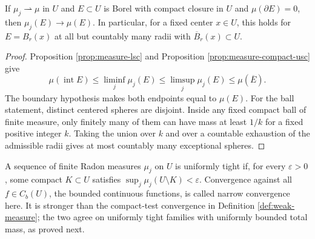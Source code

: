 \begin{corollary}\label{cor:measure-continuity-sets}
If $\mu_j\rightharpoonup\mu$ in $U$ and $E\subset U$ is Borel with compact closure in $U$ and $\mu(\partial E)=0$, then $\mu_j(E)\to\mu(E)$. In particular, for a fixed center $x\in U$, this holds for $E=B_r(x)$ at all but countably many radii with $\overline B_r(x)\subset U$.
\end{corollary}
\begin{proof}
Proposition \ref{prop:measure-lsc} and Proposition \ref{prop:measure-compact-usc} give
\[
 \mu(\operatorname{int}E)\leq\liminf_j\mu_j(E)
 \leq\limsup_j\mu_j(E)\leq\mu(\overline E).
\]
The boundary hypothesis makes both endpoints equal to $\mu(E)$. For the ball statement, distinct centered spheres are disjoint. Inside any fixed compact ball of finite measure, only finitely many of them can have mass at least $1/k$ for a fixed positive integer $k$. Taking the union over $k$ and over a countable exhaustion of the admissible radii gives at most countably many exceptional spheres.
\end{proof}

\begin{definition}\label{def:uniform-tightness}
A sequence of finite Radon measures $\mu_j$ on $U$ is uniformly tight if, for every $\varepsilon>0$, some compact $K\subset U$ satisfies $\sup_j\mu_j(U\setminus K)<\varepsilon$. Convergence against all $f\in C_b(U)$, the bounded continuous functions, is called narrow convergence here. It is stronger than the compact-test convergence in Definition \ref{def:weak-measure}; the two agree on uniformly tight families with uniformly bounded total mass, as proved next.
\end{definition}

